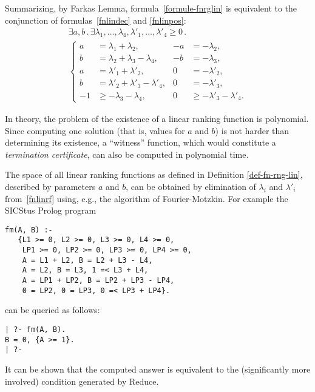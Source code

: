 \documentclass{acm_proc_article-sp}
\newcommand{\st}{\mathrel{.}}
\begin{document}
Summarizing, by Farkas Lemma,
formula~\eqref{formule-fnrglin} is equivalent to the conjunction
of formulas~\eqref{fnlindec} and \eqref{fnlinpos}:
\begin{multline}
\label{fnlinrf}
  \exists a, b  \st
    \exists \lambda_1, \ldots, \lambda_4,
            \lambda'_1, \ldots, \lambda'_4 \ge 0 \st \\
    \left\{
      \begin{aligned}
         a  &= \lambda_1 + \lambda_2,
                                & -a &= -\lambda_2, \\
         b  &= \lambda_2 + \lambda_3 - \lambda_4,
                                & -b &= -\lambda_3, \\
         a  &=   \lambda'_1+\lambda'_2,
                                &  0 &= -\lambda'_2, \\
         b  &=   \lambda'_2+\lambda'_3-\lambda'_4,
                                &  0 &= -\lambda'_3, \\
         -1 &\ge -\lambda_3 -\lambda_4,
                                &  0  &\ge -\lambda'_3 -\lambda'_4.
      \end{aligned}
    \right.
\end{multline}

In theory, the problem of the existence of a linear ranking function
is polynomial. Since computing one solution (that is, values for
$a$ and $b$) is not harder than determining its existence,
a ``witness'' function, which would constitute a
\emph{termination certificate}, can also be computed in polynomial time.

The space of all linear ranking functions as defined in Definition \ref{def-fn-rng-lin},
described by parameters $a$ and $b$,
can be obtained by elimination of $\lambda_i$ and $\lambda'_i$
from~\eqref{fnlinrf} using, e.g., the algorithm of Fourier-Motzkin.
For example the SICStus Prolog program
\begin{verbatim}
fm(A, B) :-
   {L1 >= 0, L2 >= 0, L3 >= 0, L4 >= 0,
    LP1 >= 0, LP2 >= 0, LP3 >= 0, LP4 >= 0,
    A = L1 + L2, B = L2 + L3 - L4,
    A = L2, B = L3, 1 =< L3 + L4,
    A = LP1 + LP2, B = LP2 + LP3 - LP4,
    0 = LP2, 0 = LP3, 0 =< LP3 + LP4}.
\end{verbatim}
can be queried as follows:
\begin{verbatim}
| ?- fm(A, B).
B = 0, {A >= 1}.
| ?-
\end{verbatim}
It can be shown that the computed answer is equivalent to the
(significantly more involved) condition generated by Reduce.
\end{document}
